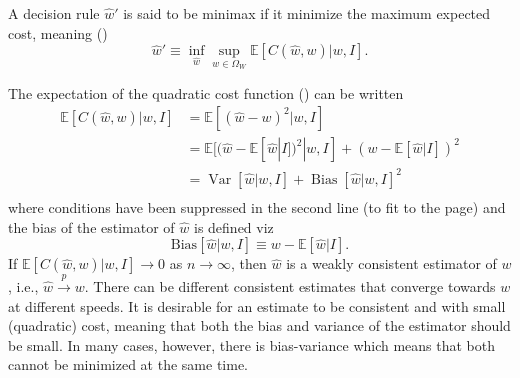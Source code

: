 \begin{definition}
	\label{def:minimax}
	A decision rule $\hat{w}'$ is said to be minimax if it minimize the maximum expected cost, meaning ()
	\begin{equation}
		\hat{w}' \equiv \inf_{\hat{w}}\sup_{w\in \Omega_W}\mathbb{E}[C(\hat{w},w)|w,I].
	\end{equation}
\end{definition}


\begin{theorem}
	\label{theorem:MSE}
	The expectation of the quadratic cost function () can be written
	\begin{equation}
		\begin{split}
			\mathbb{E}[C(\hat{w}, w)|w,I] &= \mathbb{E}[(\hat{w}-w)^2|w,I]\\ 
			&= \mathbb{E}[(\hat{w}-\mathbb{E}[\hat{w}|I])^2|w,I]+(w-\mathbb{E}[\hat{w}|I])^2\\
			&=\operatorname{Var}[\hat{w}|w,I]+\operatorname{Bias}[\hat{w}|w,I]^2\\
		\end{split}
		\label{eq:MSE}
	\end{equation}
	where conditions have been suppressed in the second line (to fit to the page) and the bias of the estimator of $\hat{w}$ is defined viz
	\begin{equation}
		\text{Bias}[\hat{w}|w,I]\equiv w-\mathbb{E}[\hat{w}|I].
	\end{equation}
	If $\mathbb{E}[C(\hat{w}, w)|w,I] \to 0$ as $n \to \infty$, then $\hat{w}$ is a weakly consistent estimator of $w$, i.e., $\hat{w} \xrightarrow{p} w$. There can be different consistent estimates that converge towards $w$ at different speeds. It is desirable for an estimate to be consistent and with small (quadratic) cost, meaning that both the bias and variance of the estimator should be small. In many cases, however, there is bias-variance which means that both cannot be minimized at the same time. 
\end{theorem}

